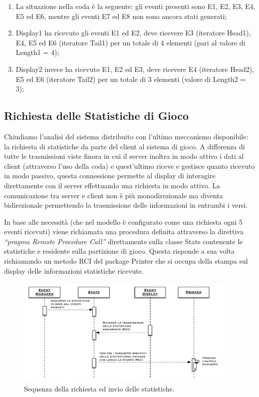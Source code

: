 \documentclass[aps,letterpaper,10pt]{article}
\begin{document}
\begin{enumerate}
\item La situazione nella coda \`e la seguente: gli eventi presenti sono E1, E2, E3, E4, E5 ed E6, mentre gli eventi E7
ed E8 non sono ancora stati generati;
\item Display1 ha ricevuto gli eventi E1 ed E2, deve ricevere E3 (iteratore Head1), E4, E5 ed E6 (iteratore Tail1) per
un totale di 4 elementi (pari al valore di Length1 = 4);
\item Display2 invece ha ricevuto E1, E2 ed E3, deve ricevere E4 (iteratore Head2), E5 ed E6 (iteratore Tail2) per un
totale di 3 elementi (valore di Length2 = 3);
\end{enumerate}

\subsection{Richiesta delle Statistiche di Gioco}

Chiudiamo l'analisi del sistema distribuito con l'ultimo meccanismo disponibile: la richiesta di statistiche da parte
del client al sistema di gioco. A differenza di tutte le trasmissioni viste finora in cui il server inoltra in modo
attivo i dati al client (attraverso l'uso della coda) e quest'ultimo riceve e gestisce quanto ricevuto in modo passivo,
questa connessione permette al display di interagire direttamente con il server effettuando una richiesta in modo
attivo. La comunicazione tra server e client non \`e pi\`u monodirezionale ma diventa bidirezionale permettendo la
trasmissione delle informazioni in entrambi i versi. \vspace{3mm}

In base alle necessit\`a (che nel modello \`e configurato come una richiesta ogni 5 eventi ricevuti) viene richiamata
una procedura definita attraverso la direttiva \emph{``pragma Remote Procedure Call''} direttamente sulla classe Stats
contenente le statistiche e residente sulla partizione di gioco. Questa risponde a sua volta richiamando un metodo RCI
del package Printer che si occupa della stampa sul display delle informazioni statistiche ricevute.

\begin{figure}[H]
	\begin{center}
		\includegraphics[width=400px]{images/stats-sequence.pdf}
	\end{center}
\caption{Sequenza della richiesta ed invio delle statistiche.}
\end{figure}
\end{document}
